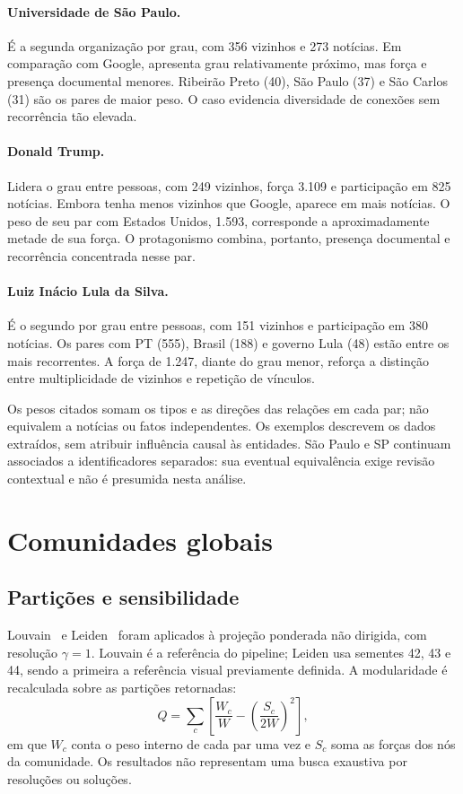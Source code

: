 \documentclass[11pt,a4paper]{article}
\begin{document}
\paragraph{Universidade de São Paulo.} É a segunda organização por grau, com 356 vizinhos e 273 notícias. Em comparação com Google, apresenta grau relativamente próximo, mas força e presença documental menores. Ribeirão Preto (40), São Paulo (37) e São Carlos (31) são os pares de maior peso. O caso evidencia diversidade de conexões sem recorrência tão elevada.

\paragraph{Donald Trump.} Lidera o grau entre pessoas, com 249 vizinhos, força 3.109 e participação em 825 notícias. Embora tenha menos vizinhos que Google, aparece em mais notícias. O peso de seu par com Estados Unidos, 1.593, corresponde a aproximadamente metade de sua força. O protagonismo combina, portanto, presença documental e recorrência concentrada nesse par.

\paragraph{Luiz Inácio Lula da Silva.} É o segundo por grau entre pessoas, com 151 vizinhos e participação em 380 notícias. Os pares com PT (555), Brasil (188) e governo Lula (48) estão entre os mais recorrentes. A força de 1.247, diante do grau menor, reforça a distinção entre multiplicidade de vizinhos e repetição de vínculos.

Os pesos citados somam os tipos e as direções das relações em cada par; não equivalem a notícias ou fatos independentes. Os exemplos descrevem os dados extraídos, sem atribuir influência causal às entidades. São Paulo e SP continuam associados a identificadores separados: sua eventual equivalência exige revisão contextual e não é presumida nesta análise.

\clearpage
\section{Comunidades globais}
\subsection{Partições e sensibilidade}
Louvain~\cite{blondel2008} e Leiden~\cite{traag2019} foram aplicados à projeção ponderada não dirigida, com resolução $\gamma=1$. Louvain é a referência do pipeline; Leiden usa sementes 42, 43 e 44, sendo a primeira a referência visual previamente definida. A modularidade é recalculada sobre as partições retornadas:
\[
Q=\sum_c\left[\frac{W_c}{W}-\left(\frac{S_c}{2W}\right)^2\right],
\]
em que $W_c$ conta o peso interno de cada par uma vez e $S_c$ soma as forças dos nós da comunidade. Os resultados não representam uma busca exaustiva por resoluções ou soluções.
\end{document}
